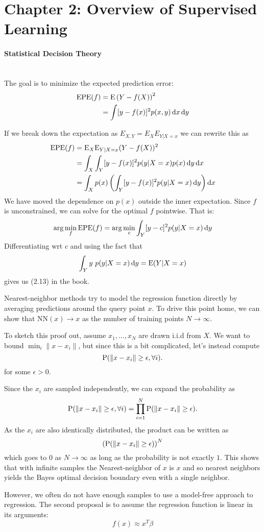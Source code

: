 \section{Chapter 2: Overview of Supervised Learning}

\paragraph{Statistical Decision Theory}\mbox{} \\

The goal is to minimize the expected prediction error:
\begin{align*}
  \mathrm{EPE}(f) &= \mathrm{E}\left(Y - f(X)\right)^2\\
  &= \int [y - f(x)]^2 p(x, y) \operatorname{d}\!{x} \operatorname{d}\!{y}
\end{align*}

If we break down the expectation as $E_{X, Y} = E_{X} E_{Y|X=x}$ we can rewrite this as 
\begin{align*}
  \mathrm{EPE}(f) &= \mathrm{E}_X \mathrm{E}_{Y|X = x} (Y - f(X))^2\\
                  &= \int_X \int_{Y}[y - f(x)]^2 p(y | X = x)p(x) \operatorname{d}\!{y} \operatorname{d}\!{x}\\
                  &= \int_X p(x)\left(\int_Y [y - f(x)]^2 p(y | X = x)\operatorname{d}\!{y} \right)\operatorname{d}\!{x}
\end{align*}
We have moved the dependence on $p(x)$ outside the inner expectation. Since $f$ is unconstrained, we can solve for the optimal $f$ pointwise. That is:
\begin{align*}
  \arg\min_{f} \mathrm{EPE}(f) = \arg\min_{c} \int_Y [y - c]^2 p(y | X = x)\operatorname{d}\!{y} 
\end{align*}
Differentiating wrt $c$ and using the fact that
$$
\int_Y y\ p(y | X = x)\operatorname{d}\!{y} = \mathrm{E}(Y | X = x)
$$
gives us (2.13) in the book.

Nearest-neighbor methods try to model the regression function directly by averaging predictions around the query point $x$. To drive this point home, we can show that $\mathrm{NN}(x) \to x$ as the number of training points $N \to \infty$.

To sketch this proof out, assume $x_1, \ldots, x_N$ are drawn i.i.d from $X$. We want to bound $\min_i \|x - x_i\|$, but since this is a bit complicated, let's instead compute
$$
\mathrm{P} (\|x - x_i\| \geq \epsilon, \forall i).
$$
for some $\epsilon > 0$.

Since the $x_i$ are sampled independently, we can expand the probability as 
$$
\mathrm{P} (\|x - x_i\| \geq \epsilon, \forall i) = \prod_{i=1}^N \mathrm{P} (\|x - x_i\| \geq \epsilon).
$$
As the $x_i$ are also identically distributed, the product can be written as 
$$
\left(\mathrm{P} (\|x - x_i\| \geq \epsilon)\right)^N
$$
which goes to $0$ as $N\to \infty$ as long as the probability is not exactly $1$. This shows that with infinite samples the Nearest-neighbor of $x$ is $x$ and so nearest neighbors yields the Bayes optimal decision boundary even with a single neighbor.

However, we often do not have enough samples to use a model-free approach to regression. The second proposal is to assume the regression function is linear in its arguments:
$$
f(x) \approx x^T \beta
$$

